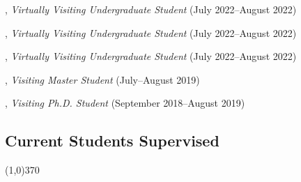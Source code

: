 \documentclass[10pt]{article}
\newenvironment{myindentpar}[1]%
{\begin{list}{}%
         {\setlength{\leftmargin}{#1}}%
         \item[]%
}
{\end{list}}
\newcounter{list}
\begin{document}
\begin{myindentpar}{0.75cm}
\hspace{-0.75cm}{\bf Xuan Zhang}, \textit{Virtually Visiting Undergraduate Student} (July 2022--August 2022)

\hspace{-0.75cm}{\bf Dong Liu}, \textit{Virtually Visiting Undergraduate Student} (July 2022--August 2022)

\hspace{-0.75cm}{\bf Yuchen Li}, \textit{Virtually Visiting Undergraduate Student} (July 2022--August 2022)

\hspace{-0.75cm}{\bf Zijian Hu}, \textit{Visiting Master Student} (July--August 2019)

\hspace{-0.75cm}{\bf Tianwen Jiang}, \textit{Visiting Ph.D. Student} (September 2018--August 2019)

\end{myindentpar}

\subsection{\sc Current Students Supervised}
\vspace{-0.4cm} \line(1,0){370} \vspace{-0.1cm}
\end{document}
